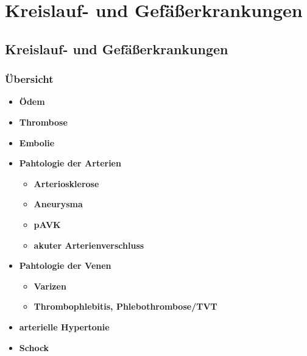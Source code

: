 \section*{Kreislauf- und Gefäßerkrankungen}
	\subsection*{Kreislauf- und Gefäßerkrankungen}
		\subsubsection*{Übersicht}
			\begin{itemize}
				\item \textbf{Ödem}
				\item \textbf{Thrombose}
				\item \textbf{Embolie}
				\item \textbf{Pahtologie der Arterien}
					\begin{itemize}
						\item \textbf{Arteriosklerose}
						\item \textbf{Aneurysma}
						\item \textbf{pAVK}
						\item \textbf{akuter Arterienverschluss}
					\end{itemize}
				\item \textbf{Pahtologie der Venen}
					\begin{itemize}
						\item \textbf{Varizen}
						\item \textbf{Thrombophlebitis, Phlebothrombose/TVT}
					\end{itemize}
				\item \textbf{arterielle Hypertonie}
				\item \textbf{Schock}
			\end{itemize}
